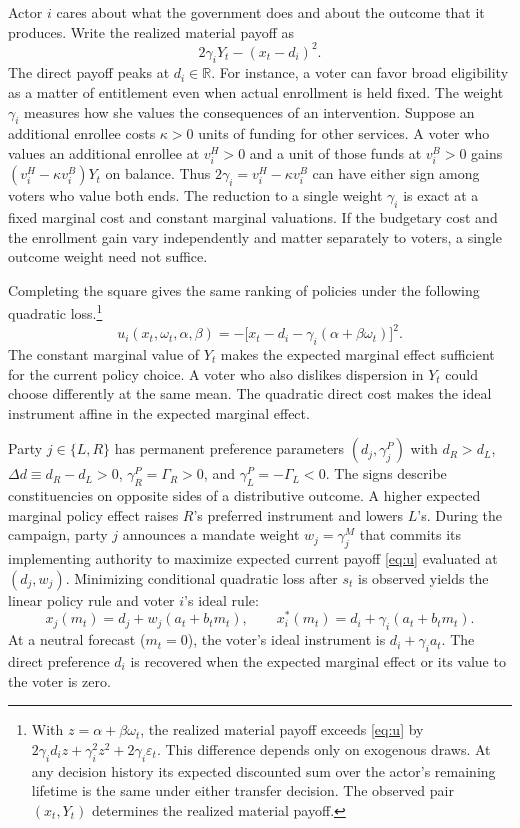 \documentclass[11pt,letterpaper]{article}
\newcommand{\Dd}{\Delta d}
\begin{document}
Actor $i$ cares about what the government does and about the outcome that it produces. Write the realized material payoff as
\[
 2\gamma_i Y_t-(x_t-d_i)^2 .
\]
The direct payoff peaks at $d_i\in\mathbb R$. For instance, a voter can favor broad eligibility as a matter of entitlement even when actual enrollment is held fixed. The weight $\gamma_i$ measures how she values the consequences of an intervention. Suppose an additional enrollee costs $\kappa>0$ units of funding for other services. A voter who values an additional enrollee at $v_i^H>0$ and a unit of those funds at $v_i^B>0$ gains $(v_i^H-\kappa v_i^B)Y_t$ on balance. Thus $2\gamma_i=v_i^H-\kappa v_i^B$ can have either sign among voters who value both ends. The reduction to a single weight $\gamma_i$ is exact at a fixed marginal cost and constant marginal valuations. If the budgetary cost and the enrollment gain vary independently and matter separately to voters, a single outcome weight need not suffice.

Completing the square gives the same ranking of policies under the following quadratic loss.\footnote{With $z=\alpha+\beta\omega_t$, the realized material payoff exceeds \eqref{eq:u} by $2\gamma_i d_i z+\gamma_i^2z^2+2\gamma_i\varepsilon_t$. This difference depends only on exogenous draws. At any decision history its expected discounted sum over the actor's remaining lifetime is the same under either transfer decision. The observed pair $(x_t,Y_t)$ determines the realized material payoff.}
\begin{equation}
 u_i(x_t,\omega_t,\alpha,\beta)
   =-\big[x_t-d_i-\gamma_i(\alpha+\beta\omega_t)\big]^2 .
 \label{eq:u}
\end{equation}
The constant marginal value of $Y_t$ makes the expected marginal effect sufficient for the current policy choice. A voter who also dislikes dispersion in $Y_t$ could choose differently at the same mean. The quadratic direct cost makes the ideal instrument affine in the expected marginal effect.

Party $j\in\{L,R\}$ has permanent preference parameters $(d_j,\gamma_j^P)$ with $d_R>d_L$, $\Dd\equiv d_R-d_L>0$, $\gamma_R^P=\Gamma_R>0$, and $\gamma_L^P=-\Gamma_L<0$. The signs describe constituencies on opposite sides of a distributive outcome. A higher expected marginal policy effect raises $R$'s preferred instrument and lowers $L$'s. During the campaign, party $j$ announces a mandate weight $w_j=\gamma_j^M$ that commits its implementing authority to maximize expected current payoff \eqref{eq:u} evaluated at $(d_j,w_j)$. Minimizing conditional quadratic loss after $s_t$ is observed yields the linear policy rule and voter $i$'s ideal rule:
\begin{equation}
 x_j(m_t)=d_j+w_j(a_t+b_t m_t),\qquad
 x_i^*(m_t)=d_i+\gamma_i(a_t+b_t m_t).
 \label{eq:rule}
\end{equation}
At a neutral forecast ($m_t=0$), the voter's ideal instrument is $d_i+\gamma_i a_t$. The direct preference $d_i$ is recovered when the expected marginal effect or its value to the voter is zero.
\end{document}

